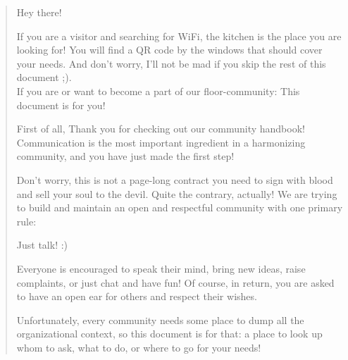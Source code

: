 \pagestyle{empty}

\renewcommand{\abstractname}{What's this about?}

\begin{abstract}

    Hey there!

    If you are a visitor and searching for WiFi, the kitchen is the place you are looking for! You will find a QR code by the windows that should cover your needs. And don't worry, I'll not be mad if you skip the rest of this document ;).\\
    If you are or want to become a part of our floor-community: This document is for you!

    First of all, Thank you for checking out our community handbook! Communication is the most important ingredient in a harmonizing community, and you have just made the first step!

    Don't worry, this is not a page-long contract you need to sign with blood and sell your soul to the devil. Quite the contrary, actually! We are trying to build and maintain an open and respectful community with one primary rule:

    \begin{displayquote}
        Just talk! :)
    \end{displayquote}

    Everyone is encouraged to speak their mind, bring new ideas, raise complaints, or just chat and have fun! Of course, in return, you are asked to have an open ear for others and respect their wishes.

    Unfortunately, every community needs some place to dump all the organizational context, so this document is for that: a place to look up whom to ask, what to do, or where to go for your needs!

\end{abstract}
\newpage